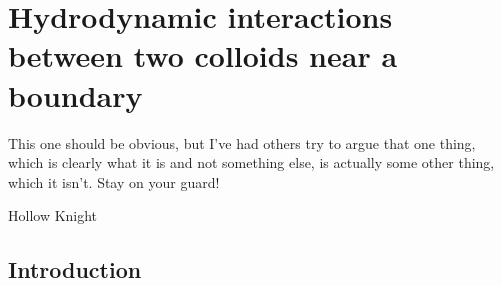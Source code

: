 \chapter{Hydrodynamic interactions between two colloids near a boundary}
\label{chapter2}

\epigraph{This one should be obvious, but I've had others try to argue that one thing, which is clearly what it is and not something else, is actually some other thing, which it isn't. Stay on your guard!}{Hollow Knight}
\section{Introduction} 

